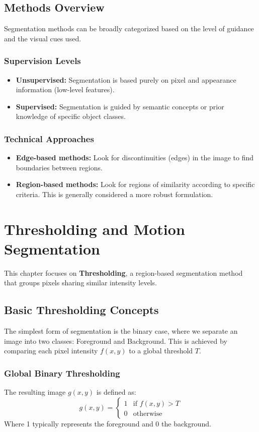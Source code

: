 \documentclass{report}
\begin{document}
\section{Methods Overview}
Segmentation methods can be broadly categorized based on the level of guidance and the visual cues used.

\subsection{Supervision Levels}
\begin{itemize}
    \item \textbf{Unsupervised:} Segmentation is based purely on pixel and appearance information (low-level features).
    \item \textbf{Supervised:} Segmentation is guided by semantic concepts or prior knowledge of specific object classes.
\end{itemize}

\subsection{Technical Approaches}
\begin{itemize}
    \item \textbf{Edge-based methods:} Look for discontinuities (edges) in the image to find boundaries between regions.
    \item \textbf{Region-based methods:} Look for regions of similarity according to specific criteria. This is generally considered a more robust formulation.
\end{itemize}

\chapter{Thresholding and Motion Segmentation}

This chapter focuses on \textbf{Thresholding}, a region-based segmentation method that groups pixels sharing similar intensity levels.

\section{Basic Thresholding Concepts}
The simplest form of segmentation is the binary case, where we separate an image into two classes: Foreground and Background. This is achieved by comparing each pixel intensity $f(x,y)$ to a global threshold $T$.

\subsection{Global Binary Thresholding}
The resulting image $g(x,y)$ is defined as:
\begin{equation}
    g(x,y) = \begin{cases} 1 & \text{if } f(x,y) > T \\ 0 & \text{otherwise} \end{cases}
\end{equation}
Where 1 typically represents the foreground and 0 the background.
\end{document}
